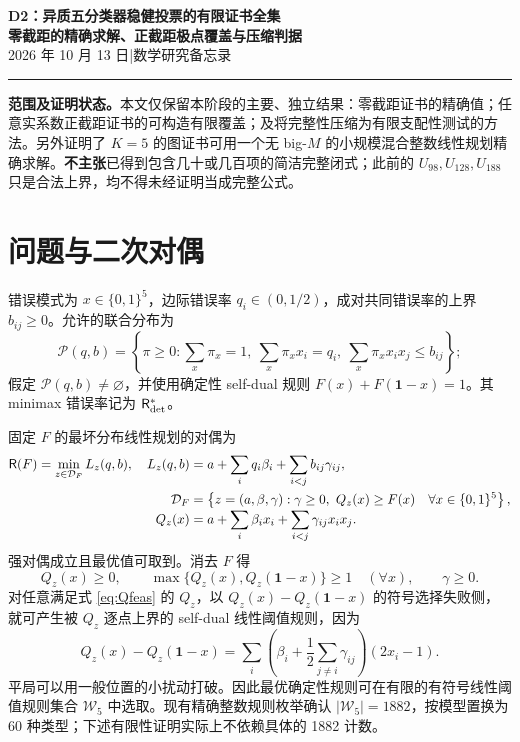 \documentclass[11pt,a4paper]{ctexart}
\theoremstyle{definition}
\newcommand{\calP}{\mathcal P}
\newcommand{\calD}{\mathcal D}
\newcommand{\one}{\mathbf1}
\newcommand{\Risk}{\mathsf R}
\begin{document}
\begin{center}
{\Large\bfseries D2：异质五分类器稳健投票的有限证书全集}\\[0.35em]
{\large\bfseries 零截距的精确求解、正截距极点覆盖与压缩判据}\\[0.7em]
2026 年 10 月 13 日\quad |\quad 数学研究备忘录\\
\end{center}
\noindent\textcolor{dblue}{\rule{\textwidth}{1.1pt}}
\noindent\textbf{范围及证明状态。}本文仅保留本阶段的主要、独立结果：零截距证书的精确值；任意实系数正截距证书的可构造有限覆盖；及将完整性压缩为有限支配性测试的方法。另外证明了 $K=5$ 的图证书可用一个无 big-$M$ 的小规模混合整数线性规划精确求解。\textbf{不主张}已得到包含几十或几百项的简洁完整闭式；此前的 $U_{98},U_{128},U_{188}$ 只是合法上界，均不得未经证明当成完整公式。

\section{问题与二次对偶}
错误模式为 $x\in\{0,1\}^5$，边际错误率 $q_i\in(0,1/2)$，成对共同错误率的上界 $b_{ij}\ge0$。允许的联合分布为
\[
\calP(q,b)=\left\{\pi\ge0:\sum_x\pi_x=1,\ \sum_x\pi_xx_i=q_i,\ \sum_x\pi_xx_ix_j\le b_{ij}\right\};
\]
假定 $\calP(q,b)\ne\varnothing$，并使用确定性 self-dual 规则 $F(x)+F(\one-x)=1$。其 minimax 错误率记为 $\Risk^*_{\rm det}$。

固定 $F$ 的最坏分布线性规划的对偶为
\begin{align}\label{eq:dual}
\Risk(F)=\min_{z\in\calD_F}L_z(q,b),\quad
L_z(q,b)&=a+\sum_iq_i\beta_i+\sum_{i<j}b_{ij}\gamma_{ij},\\
\calD_F&=\left\{z=(a,\beta,\gamma):\gamma\ge0,\ 
Q_z(x)\ge F(x)\quad\forall x\in\{0,1\}^5\right\},\notag\\[-0.3em]
Q_z(x)&=a+\sum_i\beta_ix_i+\sum_{i<j}\gamma_{ij}x_ix_j.\notag
\end{align}
强对偶成立且最优值可取到。消去 $F$ 得
\begin{equation}\label{eq:Qfeas}
Q_z(x)\ge0,\qquad
\max\{Q_z(x),Q_z(\one-x)\}\ge1\quad(\forall x),\qquad\gamma\ge0.
\end{equation}
对任意满足式 \eqref{eq:Qfeas} 的 $Q_z$，以 $Q_z(x)-Q_z(\one-x)$ 的符号选择失败侧，就可产生被 $Q_z$ 逐点上界的 self-dual 线性阈值规则，因为
\[
Q_z(x)-Q_z(\one-x)
=\sum_i\left(\beta_i+\frac12\sum_{j\ne i}\gamma_{ij}\right)(2x_i-1).
\]
平局可以用一般位置的小扰动打破。因此最优确定性规则可在有限的有符号线性阈值规则集合 $\mathcal W_5$ 中选取。现有精确整数规则枚举确认 $|\mathcal W_5|=1882$，按模型置换为 60 种类型；下述有限性证明实际上不依赖具体的 1882 计数。
\end{document}
